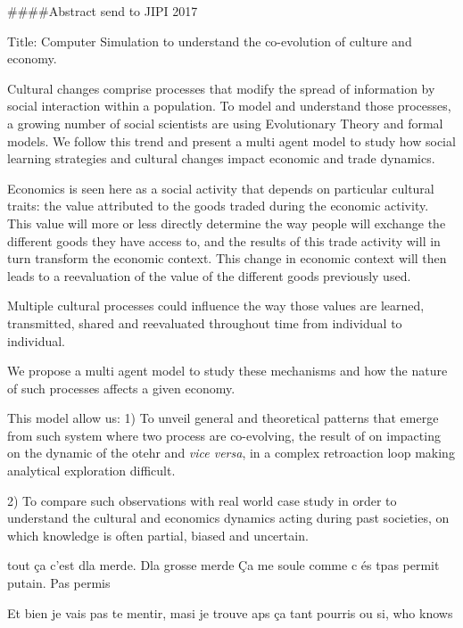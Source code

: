 ####Abstract send to JIPI 2017


Title: Computer Simulation to understand the co-evolution of culture and economy.

Cultural changes comprise processes that modify the spread of information by social interaction within a population. To model and understand those processes, a growing number of social scientists are using Evolutionary Theory and formal models.
We follow this trend and present a multi agent model to study how social learning strategies and cultural changes impact economic and trade dynamics. 

Economics is seen here as a social activity that depends on particular cultural traits: the value attributed to the goods traded during the economic activity. 
This value will more or less directly determine the way people will exchange the different goods they have access to, and the results of this trade activity will in turn transform the economic context. This change in economic context will then leads to a reevaluation of the value of the different goods previously used.

Multiple cultural processes could influence the way those values are learned, transmitted, shared and reevaluated throughout time from individual to individual. 

We propose a multi agent model to study these mechanisms and how the nature of such processes affects a given economy.

This model allow us:
	1) To unveil general and theoretical patterns that emerge from such system where two process are co-evolving, the result of on impacting on the dynamic of the otehr and \emph{vice versa}, in a complex retroaction loop making analytical exploration difficult.

	2) To compare such observations  with real world case study in order to understand the cultural and economics dynamics acting during past societies, on which knowledge is often partial, biased and uncertain. 


tout ça c'est dla merde.
Dla grosse merde
Ça me soule comme c és tpas permit putain. Pas permis


Et bien je vais pas te mentir, masi je trouve aps ça tant pourris ou si, who knows
